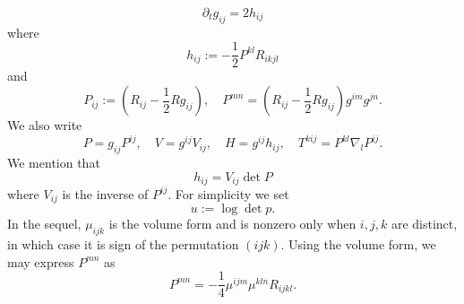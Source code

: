 \documentclass{amsart}
\theoremstyle{definition}
\theoremstyle{remark}
\numberwithin{equation}{section}
\begin{document}
\begin{equation}
\partial_tg_{ij}=2h_{ij}
\end{equation}
where
\begin{equation}
h_{ij}:=-\frac{1}{2}P^{kl}R_{ikjl}
\end{equation}
and
\begin{equation}
P_{ij}:=(R_{ij}-\frac{1}{2}Rg_{ij}),\quad
P^{mn}=(R_{ij}-\frac{1}{2}Rg_{ij})g^{im}g^{jn}.
\end{equation}
We also write
\begin{equation}
P=g_{ij}P^{ij},\quad V=g^{ij}V_{ij},\quad H=g^{ij}h_{ij},\quad  T^{kij}=P^{kl}\nabla_l P^{ij}.
\end{equation}
We mention that
\begin{equation}
h_{ij}=V_{ij}\det P
\end{equation}
where $V_{ij}$ is the inverse of $P^{ij}.$
For simplicity we set
\[u:=\log\det p.\]
In the sequel, $\mu_{ijk}$ is the volume form and is nonzero only when $i,j,k$ are distinct, in which case it is sign of the permutation $(ijk)$. Using the volume form, we may express $P^{mn}$ as
\begin{equation}
P^{mn}=-\frac{1}{4}\mu^{ijm}\mu^{kln}R_{ijkl}.
\end{equation}
\end{document}
